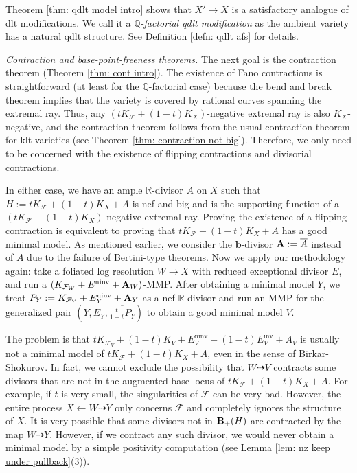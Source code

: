 \documentclass[12pt]{amsart}
\numberwithin{equation}{section}
\newcommand{\bb}{\bm{b}}
\newcommand{\Qq}{\mathbb{Q}}
\newcommand{\Rr}{\mathbb{R}}
\newcommand{\ninv}{\operatorname{ninv}}
\newcommand{\inv}{\operatorname{inv}}
\newcommand{\Aa}{{\bf{A}}}
\newcommand{\Bb}{{\bf{B}}}
\newcommand{\Ff}{\mathcal{F}}
\theoremstyle{definition}
\theoremstyle{definition}
\theoremstyle{definition}
\begin{document}
Theorem \ref{thm: qdlt model intro} shows that $X' \rightarrow X$ is a satisfactory analogue of dlt modifications. We call it a \emph{$\Qq$-factorial qdlt modification} as the ambient variety has a natural qdlt structure. See Definition \ref{defn: qdlt afs} for details.

\smallskip

\noindent\textit{Contraction and base-point-freeness theorems.} The next goal is the contraction theorem (Theorem \ref{thm: cont intro}). The existence of Fano contractions is straightforward (at least for the $\Qq$-factorial case) because the bend and break theorem implies that the variety is covered by rational curves spanning the extremal ray. Thus, any $(tK_{\Ff}+(1-t)K_X)$-negative extremal ray is also $K_X$-negative, and the contraction theorem follows from the usual contraction theorem for klt varieties (see Theorem \ref{thm: contraction not big}). Therefore, we only need to be concerned with the existence of flipping contractions and divisorial contractions.

In either case, we have an ample $\Rr$-divisor $A$ on $X$ such that $H:=tK_{\Ff}+(1-t)K_X+A$ is nef and big and is the supporting function of a $(tK_{\Ff}+(1-t)K_X)$-negative extremal ray. Proving the existence of a flipping contraction is equivalent to proving that $tK_{\Ff}+(1-t)K_X+A$ has a good minimal model. As mentioned earlier, we consider the $\bb$-divisor $\Aa:=\overline{A}$ instead of $A$ due to the failure of Bertini-type theorems. Now we apply our methodology again: take a foliated log resolution $W \rightarrow X$ with reduced exceptional divisor $E$, and run a $(K_{\Ff_W}+E^{\ninv}+\Aa_W)$-MMP. After obtaining a minimal model $Y$, we treat $P_Y:=K_{\Ff_Y}+E_Y^{\ninv}+\Aa_Y$ as a nef $\Rr$-divisor and run an MMP for the generalized pair $(Y,E_Y,\overline{\frac{t}{1-t}P_Y})$ to obtain a good minimal model $V$.

The problem is that $tK_{\Ff_V}+(1-t)K_V+E_V^{\ninv}+(1-t)E_V^{\inv}+A_V$ is usually not a minimal model of $tK_{\Ff}+(1-t)K_X+A$, even in the sense of Birkar-Shokurov. In fact, we cannot exclude the possibility that $W \dashrightarrow V$ contracts some divisors that are not in the augmented base locus of $tK_{\Ff}+(1-t)K_X+A$. For example, if $t$ is very small, the singularities of $\Ff$ can be very bad. However, the entire process $X \leftarrow W \dashrightarrow Y$ only concerns $\Ff$ and completely ignores the structure of $X$. It is very possible that some divisors not in $\Bb_+(H)$ are contracted by the map $W \dashrightarrow Y$. However, if we contract any such divisor, we would never obtain a minimal model by a simple positivity computation (see Lemma \ref{lem: nz keep under pullback}(3)).
\end{document}
